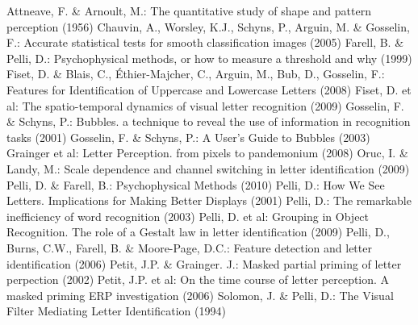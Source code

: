 \documentclass[runningheads,a4paper]{llncs}
\begin{document}
\begin{thebibliography}{20}
  	Attneave, F. \& Arnoult, M.: The quantitative study of shape and pattern perception (1956)
  	Chauvin, A., Worsley, K.J., Schyns, P., Arguin, M. \& Gosselin, F.: Accurate statistical tests for smooth classification images (2005)
  		Farell, B. \& Pelli, D.: Psychophysical methods, or how to measure a threshold and why (1999)
  		Fiset, D. \& Blais, C., \'Ethier-Majcher, C., Arguin, M., Bub, D., Gosselin, F.: Features for Identification of Uppercase and Lowercase Letters (2008)
  		Fiset, D. et al: The spatio-temporal dynamics of visual letter recognition (2009)
  			Gosselin, F. \& Schyns, P.: Bubbles. a technique to reveal the use of information in recognition tasks (2001)
  		Gosselin, F. \& Schyns, P.: A User's Guide to Bubbles (2003)
  		Grainger et al: Letter Perception. from pixels to pandemonium (2008)
  		Oruc, I. \& Landy, M.: Scale dependence and channel switching in letter identification (2009)
  		Pelli, D. \& Farell, B.: Psychophysical Methods (2010)
  			Pelli, D.: How We See Letters. Implications for Making Better Displays (2001)
  		Pelli, D.: The remarkable inefficiency of word recognition (2003)
  		Pelli, D. et al: Grouping in Object Recognition. The role of a Gestalt law in letter identification (2009)
  		Pelli, D., Burns, C.W., Farell, B. \& Moore-Page, D.C.: Feature detection and letter identification (2006)
  	Petit, J.P. \& Grainger. J.: Masked partial priming of letter perpection (2002)
  		Petit, J.P. et al: On the time course of letter perception. A masked priming ERP investigation (2006)
  	Solomon, J. \& Pelli, D.: The Visual Filter Mediating Letter Identification (1994)


\end{thebibliography}
\end{document}
